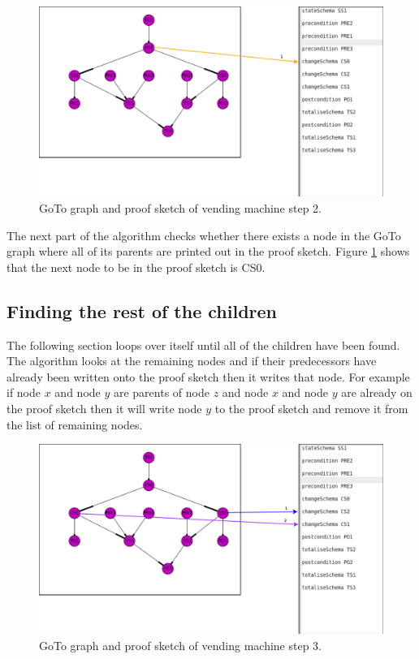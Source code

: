 \begin{figure}[H]
\includegraphics[scale=0.3]{Figures/skeleton/2.png}
\caption{GoTo graph and proof sketch of vending machine step 2.}
\label{fig:2}
\end{figure}

The next part of the algorithm checks whether there exists a node in the GoTo
graph where all of its parents are printed out in the proof sketch. Figure
\ref{fig:2} shows that the next node to be in the proof sketch is CS0. 

\subsection{Finding the rest of the children}
The following section loops over itself until all of the children have been found.
The algorithm looks at the remaining nodes and if their predecessors have already 
been written onto the proof sketch then it writes that node.
For example if node $x$ and node $y$ are parents of node $z$ and node $x$ and node $y$
are already on the proof sketch then it will write node $y$ to the proof sketch and
remove it from the list of remaining nodes.

\begin{figure}[H]
\includegraphics[scale=0.3]{Figures/skeleton/3.png}
\caption{GoTo graph and proof sketch of vending machine step 3.}
\label{fig:3}
\end{figure}

